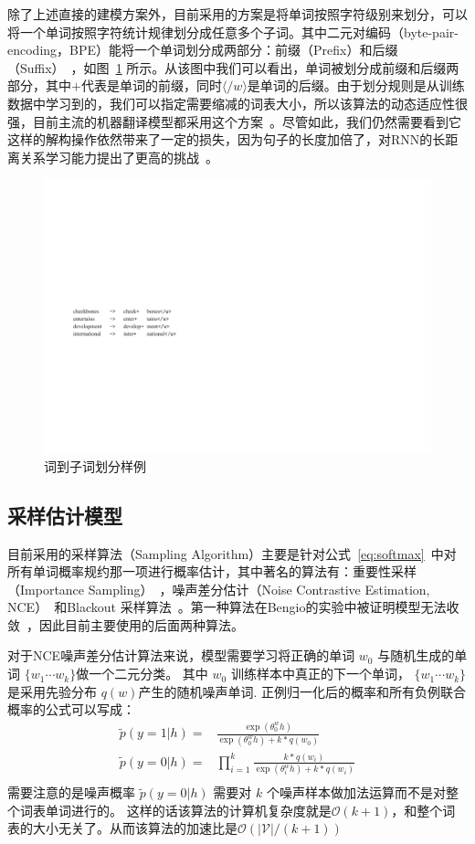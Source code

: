 除了上述直接的建模方案外，目前采用的方案是将单词按照字符级别来划分，可以将一个单词按照字符统计规律划分成任意多个子词。其中二元对编码（byte-pair-encoding，BPE）能将一个单词划分成两部分：前缀（Prefix）和后缀（Suffix）~，如图~\ref{fig:subword} 所示。从该图中我们可以看出，单词被划分成前缀和后缀两部分，其中$+$代表是单词的前缀，同时$\langle /w \rangle$是单词的后缀。由于划分规则是从训练数据中学习到的，我们可以指定需要缩减的词表大小，所以该算法的动态适应性很强，目前主流的机器翻译模型都采用这个方案~。尽管如此，我们仍然需要看到它这样的解构操作依然带来了一定的损失，因为句子的长度加倍了，对RNN的长距离关系学习能力提出了更高的挑战~。

\begin{figure}[!h]
  \centering
\includegraphics[width=0.6\linewidth]{./figures/subword.pdf}
\caption{词到子词划分样例}\label{fig:subword}
\end{figure}

\subsection{采样估计模型}
目前采用的采样算法（Sampling Algorithm）主要是针对公式~\ref{eq:softmax}~中对所有单词概率规约那一项进行概率估计，其中著名的算法有：重要性采样（Importance Sampling）~，噪声差分估计（Noise Contrastive Estimation, NCE）~和Blackout 采样算法~。第一种算法在Bengio的实验中被证明模型无法收敛~，因此目前主要使用的后面两种算法。

对于NCE噪声差分估计算法来说，模型需要学习将正确的单词 $w_0$ 与随机生成的单词 $\{w_1\cdots w_k\}$做一个二元分类。 其中 $w_0$ 训练样本中真正的下一个单词， $\{w_1\cdots w_k\}$ 是采用先验分布  $q(w)$产生的随机噪声单词. 正例归一化后的概率和所有负例联合概率的公式可以写成：
\begin{equation}\label{equ:nce}
\begin{split}
  \tilde{p}(y=1|h)=&\frac{\exp( \theta^w_0 h)}{ \exp( \theta^w_0 h)+k *q(w_0)}\\
  \tilde{p}(y=0|h)=&\prod_{i=1}^{k}\frac{k *q(w_i)}{\exp( \theta^w_i h)+k *q(w_i)}\\
\end{split}
\end{equation}
需要注意的是噪声概率 $\tilde{p}(y=0|h)$ 需要对 $k$ 个噪声样本做加法运算而不是对整个词表单词进行的。 这样的话该算法的计算机复杂度就是$\mathcal{O}(k+1)$，和整个词表的大小无关了。从而该算法的加速比是$\mathcal{O}(\mathcal{|V|}/(k+1))$

